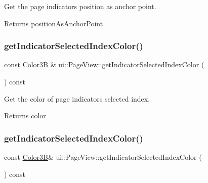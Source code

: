 Get the page indicator\textquotesingle{}s position as anchor point. 

\begin{DoxyReturn}{Returns}
position\+As\+Anchor\+Point 
\end{DoxyReturn}
\mbox{\label{classui_1_1PageView_ab954bc94d40d06d3639f36d224455d85}} 
\subsubsection{\texorpdfstring{get\+Indicator\+Selected\+Index\+Color()}{getIndicatorSelectedIndexColor()}\hspace{0.1cm}{\footnotesize\ttfamily [1/2]}}
{\footnotesize\ttfamily const \hyperlink{structColor3B}{Color3B} \& ui\+::\+Page\+View\+::get\+Indicator\+Selected\+Index\+Color (\begin{DoxyParamCaption}{ }\end{DoxyParamCaption}) const}



Get the color of page indicator\textquotesingle{}s selected index. 

\begin{DoxyReturn}{Returns}
color 
\end{DoxyReturn}
\mbox{\label{classui_1_1PageView_af5ee5b55b6e844913fe14e7ce069f1bc}} 
\subsubsection{\texorpdfstring{get\+Indicator\+Selected\+Index\+Color()}{getIndicatorSelectedIndexColor()}\hspace{0.1cm}{\footnotesize\ttfamily [2/2]}}
{\footnotesize\ttfamily const \hyperlink{structColor3B}{Color3B}\& ui\+::\+Page\+View\+::get\+Indicator\+Selected\+Index\+Color (\begin{DoxyParamCaption}{ }\end{DoxyParamCaption}) const}



